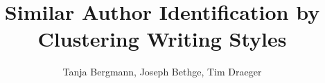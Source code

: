 \documentclass{llncs}
\title{Similar Author Identification by Clustering Writing Styles}
\author{Tanja Bergmann, Joseph Bethge, Tim Draeger}
\institute{Hasso Plattner Institute, Potsdam, Germany}
\begin{document}
\maketitle

\begin{abstract}

\end{abstract}













\newpage


\end{document}
